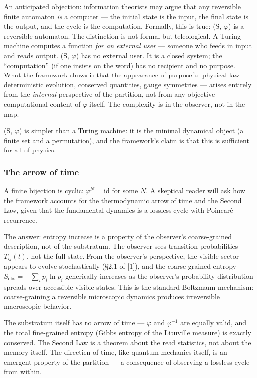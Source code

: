 \documentclass[
  11pt,
]{article}
\begin{document}
An anticipated objection: information theorists may argue that any
reversible finite automaton \emph{is} a computer --- the initial state
is the input, the final state is the output, and the cycle is the
computation. Formally, this is true: (S, \(\varphi\)) is a reversible
automaton. The distinction is not formal but teleological. A Turing
machine computes a function \emph{for an external user} --- someone who
feeds in input and reads output. (S, \(\varphi\)) has no external user.
It is a closed system; the ``computation'' (if one insists on the word)
has no recipient and no purpose. What the framework shows is that the
appearance of purposeful physical law --- deterministic evolution,
conserved quantities, gauge symmetries --- arises entirely from the
\emph{internal} perspective of the partition, not from any objective
computational content of \(\varphi\) itself. The complexity is in the
observer, not in the map.

(S, \(\varphi\)) is simpler than a Turing machine: it is the minimal
dynamical object (a finite set and a permutation), and the framework's
claim is that this is sufficient for all of physics.

\hypertarget{the-arrow-of-time}{%
\subsubsection{The arrow of time}\label{the-arrow-of-time}}

A finite bijection is cyclic: \(\varphi^N = \mathrm{id}\) for some
\(N\). A skeptical reader will ask how the framework accounts for the
thermodynamic arrow of time and the Second Law, given that the
fundamental dynamics is a lossless cycle with Poincaré recurrence.

The answer: entropy increase is a property of the observer's
coarse-grained description, not of the substratum. The observer sees
transition probabilities \(T_{ij}(t)\), not the full state. From the
observer's perspective, the visible sector appears to evolve
stochastically (§2.1 of {[}1{]}), and the coarse-grained entropy
\(S_{\mathrm{obs}} = -\sum_i p_i \ln p_i\) generically increases as the
observer's probability distribution spreads over accessible visible
states. This is the standard Boltzmann mechanism: coarse-graining a
reversible microscopic dynamics produces irreversible macroscopic
behavior.

The substratum itself has no arrow of time --- \(\varphi\) and
\(\varphi^{-1}\) are equally valid, and the total fine-grained entropy
(Gibbs entropy of the Liouville measure) is exactly conserved. The
Second Law is a theorem about the read statistics, not about the memory
itself. The direction of time, like quantum mechanics itself, is an
emergent property of the partition --- a consequence of observing a
lossless cycle from within.
\end{document}
